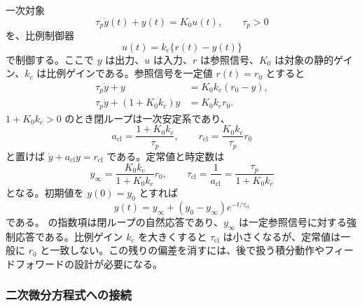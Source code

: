 \begin{example}[比例制御された一次対象の初期値応答]
一次対象
\begin{equation}
  \tau_p\dot{y}(t)+y(t)=K_0u(t),\qquad \tau_p>0
\end{equation}
を、比例制御器
\begin{equation}
  u(t)=k_c\{r(t)-y(t)\}
\end{equation}
で制御する。ここで $y$ は出力、$u$ は入力、$r$ は参照信号、$K_0$ は対象の静的ゲイン、$k_c$ は比例ゲインである。参照信号を一定値 $r(t)=r_0$ とすると
\begin{align}
  \tau_p\dot{y}+y&=K_0k_c(r_0-y),\\
  \tau_p\dot{y}+(1+K_0k_c)y&=K_0k_c r_0.
\end{align}
$1+K_0k_c>0$ のとき閉ループは一次安定系であり、
\begin{equation}
  a_{\mathrm{cl}}=\frac{1+K_0k_c}{\tau_p},
  \qquad
  r_{\mathrm{cl}}=\frac{K_0k_c}{\tau_p}r_0
\end{equation}
と置けば $\dot{y}+a_{\mathrm{cl}}y=r_{\mathrm{cl}}$ である。定常値と時定数は
\begin{equation}
  y_\infty=\frac{K_0k_c}{1+K_0k_c}r_0,
  \qquad
  \tau_{\mathrm{cl}}=\frac{1}{a_{\mathrm{cl}}}
  =\frac{\tau_p}{1+K_0k_c}
\end{equation}
となる。初期値を $y(0)=y_0$ とすれば
\begin{equation}
  y(t)=y_\infty+(y_0-y_\infty)e^{-t/\tau_{\mathrm{cl}}}
  \label{eq:proportional-first-order-response}
\end{equation}
である。 の指数項は閉ループの自然応答であり、$y_\infty$ は一定参照信号に対する強制応答である。比例ゲイン $k_c$ を大きくすると $\tau_{\mathrm{cl}}$ は小さくなるが、定常値は一般に $r_0$ と一致しない。この残りの偏差を消すには、後で扱う積分動作やフィードフォワードの設計が必要になる。
\end{example}

\subsubsection{二次微分方程式への接続}

